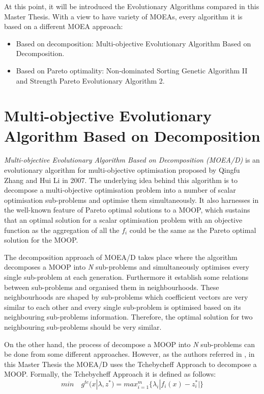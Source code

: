 
At this point, it will be introduced the Evolutionary Algorithms compared in this Master Thesis. With a view to have variety of MOEAs, every algorithm it is based on a different MOEA approach\cite{ZHOU201132}:

\begin{itemize}
    \item Based on decomposition: Multi-objective Evolutionary Algorithm Based on Decomposition.
    \item Based on Pareto optimality: Non-dominated Sorting Genetic Algorithm II and Strength Pareto Evolutionary Algorithm 2. 
\end{itemize}

\section{Multi-objective Evolutionary Algorithm Based on Decomposition}
\textit{Multi-objective Evolutionary Algorithm Based on Decomposition (MOEA/D)} is an evolutionary algorithm for multi-objective optimisation proposed by Qingfu Zhang and Hui Li in 2007\cite{Zhang2007}. The underlying idea behind this algorithm is to decompose a multi-objective optimisation problem into a number of scalar optimisation sub-problems and optimise them simultaneously. It also harnesses in the well-known feature of Pareto optimal solutions to a MOOP, which sustains that an optimal solution for a scalar optimisation problem with an objective function as the aggregation of all the $f_{i}$ could be the same as the Pareto optimal solution for the MOOP\cite{Zhang2007}.

The decomposition approach of MOEA/D takes place where the algorithm decomposes a MOOP into \textit{N} sub-problems and simultaneously optimises every single sub-problem at each generation. Furthermore it establish some relations between sub-problems and organised them in neighbourhoods. These neighbourhoods are shaped by sub-problems which coefficient vectors are very similar to each other and every single sub-problem is optimised based on its neighbouring sub-problems information. Therefore, the optimal solution for two neighbouring sub-problems should be very similar\cite{Zhang2007}.

On the other hand, the process of decompose a MOOP into \textit{N} sub-problems can be done from some different approaches. However, as the authors referred in \cite{Zhang2007}, in this Master Thesis the MOEA/D uses the Tchebycheff Approach\cite{Ma2018} to decompose a MOOP. Formally, the Tchebycheff Approach it is defined as follows:
\[
min\quad g^{te}(x|\lambda,z^{*}) = max_{i=1}^{m}\{\lambda_{i}|f_{i}(x)-z_{i}^{*}|\}
\]

